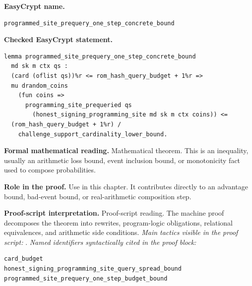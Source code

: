 \begin{formaltheorem}
\noindent\textbf{EasyCrypt name.}
\begin{lstlisting}[language=EasyCrypt,basicstyle=\ttfamily\scriptsize]
programmed_site_prequery_one_step_concrete_bound
\end{lstlisting}
\noindent\textbf{Checked EasyCrypt statement.}
\begin{lstlisting}[language=EasyCrypt,basicstyle=\ttfamily\scriptsize]
lemma programmed_site_prequery_one_step_concrete_bound
  md sk m ctx qs :
  (card (oflist qs))%r <= rom_hash_query_budget + 1%r =>
  mu drandom_coins
    (fun coins =>
      programming_site_prequeried qs
        (honest_signing_programming_site md sk m ctx coins)) <=
  (rom_hash_query_budget + 1%r) /
    challenge_support_cardinality_lower_bound.
\end{lstlisting}
\noindent\textbf{Formal mathematical reading.}
Mathematical theorem. This is an inequality, usually an arithmetic loss bound, event inclusion bound, or monotonicity fact used to compose probabilities.

\noindent\textbf{Role in the proof.}
Use in this chapter. It contributes directly to an advantage bound, bad-event bound, or real-arithmetic composition step.

\noindent\textbf{Proof-script interpretation.}
Proof-script reading. The machine proof decomposes the theorem into rewrites, program-logic obligations, relational equivalences, and arithmetic side conditions.
\emph{Main tactics visible in the proof script:} .
\emph{Named identifiers syntactically cited in the proof block:}
\begin{lstlisting}[language=EasyCrypt,basicstyle=\ttfamily\scriptsize]
card_budget
honest_signing_programming_site_query_spread_bound
programmed_site_prequery_one_step_budget_bound
\end{lstlisting}

\end{formaltheorem}

